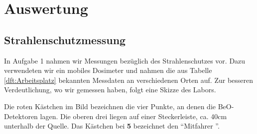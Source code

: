 \section{Auswertung}

\subsection{Strahlenschutzmessung}

In Aufgabe 1 nahmen wir Messungen bezüglich des Strahlenschutzes vor. Dazu verwendeten wir ein mobiles Dosimeter und nahmen die aus Tabelle \ref{dft:Arbeitsplatz} bekannten Messdaten an verschiedenen Orten auf. Zur besseren Verdeutlichung, wo wir gemessen haben, folgt eine Skizze des Labors.

\vspace{5mm}

\begin{center}
    \minipanf    
        \label{fig:skizze}
    \minipend
\end{center}

\vspace{5mm}

Die roten Kästchen im Bild bezeichnen die vier Punkte, an denen die BeO-Detektoren lagen. Die oberen drei liegen auf einer Steckerleiste, ca. 40cm unterhalb der Quelle. Das Kästchen bei \textbf{5} bezeichnet den \textquotedblleft Mitfahrer \textquotedblright.

